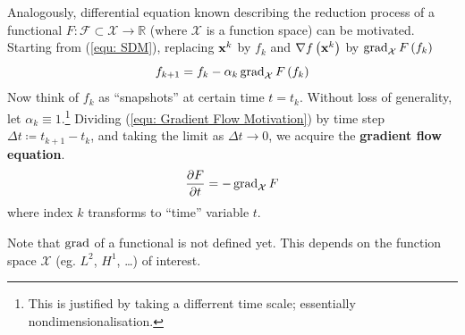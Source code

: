 \documentclass[../dissertation.tex]{subfiles}
\begin{document}
Analogously, differential equation known describing the reduction process of a functional $F:\mathcal{F} \subset \mathcal{X} \rightarrow \mathbb{R}$ (where $\mathcal{X}$ is a function space) can be motivated.
Starting from (\ref{equ: SDM}), replacing $\mathbf{x}^{k}$ by $f_k$ and $\nabla f\left( \mathbf{x}^k \right)$ by $\operatorname{grad}_{\mathcal{X}} F\left( f_k \right)$
\begin{equation}
    f_{k+1} = f_k - \alpha_k \operatorname{grad}_{\mathcal{X}} F \left( f_k \right)
    \label{equ: Gradient Flow Motivation}
\end{equation}
Now think of $f_k$ as ``snapshots'' at certain time $t = t_k$.
Without loss of generality, let $\alpha_k \equiv 1$.\footnote{
This is justified by taking a differrent time scale; essentially nondimensionalisation.}
Dividing (\ref{equ: Gradient Flow Motivation}) by time step $\Delta t \coloneqq t_{k+1} - t_k$,
and taking the limit as $\Delta t \rightarrow 0$,
we acquire the \textbf{gradient flow equation}\cite{YSC2021}.
\begin{equation}
    \frac{\partial F}{\partial t} = - \operatorname{grad}_{\mathcal{X}} F
\end{equation}
where index $k$ transforms to ``time'' variable $t$.

Note that $\operatorname{grad}$ of a functional is not defined yet. This depends on the function space $\mathcal{X}$ (eg. $L^2$, $H^1$, \ldots) of interest.
\end{document}
